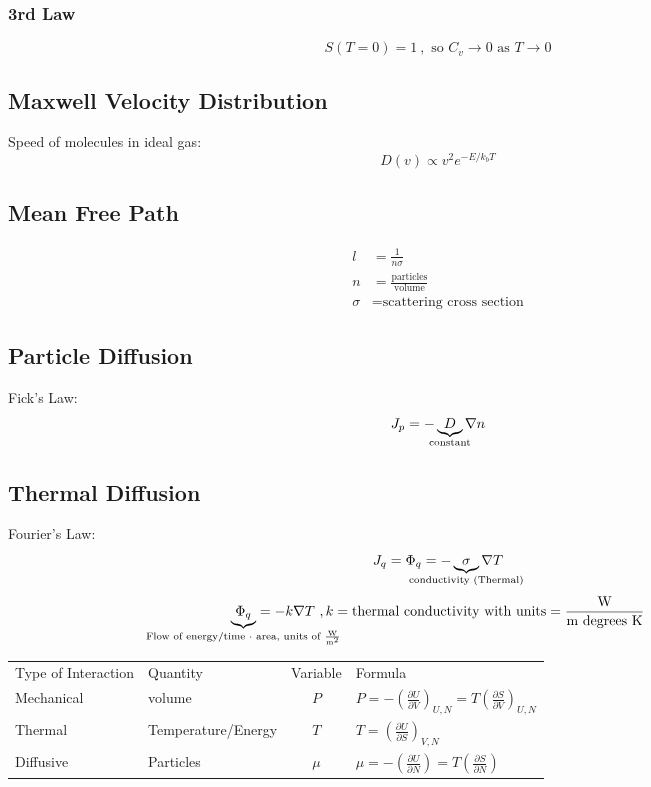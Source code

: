 \documentclass[10pt,a4paper]{article}
\begin{document}
\subsubsection{3rd Law}
\begin{equation}
 S(T=0) = 1 ~, \textrm{ so } C_v \rightarrow 0 \textrm{ as } T \rightarrow 0
\end{equation}


\subsection{Maxwell Velocity Distribution}
Speed of molecules in ideal gas:
\begin{equation}
 D(v) \propto v^2e^{-E/k_bT} 
\end{equation}

\subsection{Mean Free Path}
\begin{align}
l &= \frac{1}{n\sigma}\\
n &= \frac{\textrm{particles}}{\textrm{volume}}\\
\sigma &= \textrm{scattering cross section}
\end{align}

\subsection{Particle Diffusion}
Fick's Law:
\begin{equation}
 J_p = -\underbrace{D}_{\mathclap{\textrm{constant}}}\nabla n 
\end{equation}

\subsection{Thermal Diffusion}
Fourier's Law:
\begin{equation}
 J_q = \Phi_q = -\underbrace{\sigma}_{\mathclap{\textrm{conductivity (Thermal)}}}\nabla T
\end{equation}
\begin{equation}
 \underbrace{\Phi_q}_{\mathclap{\textrm{Flow of energy/time $\cdot$ area, units of $\frac{\textrm{W}}{\textrm{m}^2}$}}} = -k \nabla T~,k = \textrm{thermal conductivity with units}=\frac{\textrm{W}}{\textrm{m } \textrm{degrees K}}
\end{equation}

\begin{tabular}{l l c l}
Type of Interaction & Quantity & Variable & Formula \\
Mechanical & volume & $P$ & $P = - \left( \frac{\partial U}{\partial V} \right)_{U,N} = T \left( \frac{\partial S}{\partial V} \right)_{U,N} $\\
Thermal & Temperature/Energy & $T$ & $T = \left( \frac{\partial U}{\partial S} \right)_{V,N} $\\
Diffusive & Particles & $\mu$ & $\mu = - \left( \frac{\partial U}{\partial N} \right) = T \left( \frac{\partial S}{\partial N} \right)  $
\end{tabular}
\end{document}
